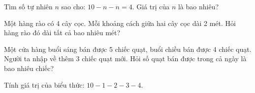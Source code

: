 \begin{ex} %
Tìm số tự nhiên $n$ sao cho: $10 - n - n = 4$. Giá trị của $n$ là bao nhiêu?
\end{ex}

\begin{ex} %
Một hàng rào có 4 cây cọc. Mỗi khoảng cách giữa hai cây cọc dài 2 mét. Hỏi hàng rào đó dài tất cả bao nhiêu mét?
\end{ex}

\begin{ex} %
Một cửa hàng buổi sáng bán được 5 chiếc quạt, buổi chiều bán được 4 chiếc quạt. Người ta nhập về thêm 3 chiếc quạt mới. Hỏi số quạt bán được trong cả ngày là bao nhiêu chiếc?
\end{ex}

\begin{ex} %
Tính giá trị của biểu thức: $10 - 1 - 2 - 3 - 4$.
\end{ex}
